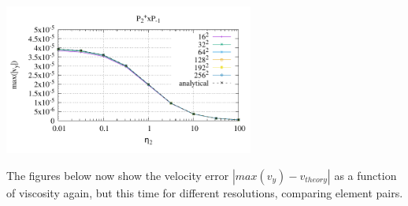 \begin{center}
\includegraphics[width=8.2cm]{python_codes/fieldstone_120/paperresults/rt/structured/rt_wave_vel_P2+P-1.pdf} 
\end{center}

\newpage
The figures below now show the velocity error $|max(v_y)-v_{theory}|$ as a function of viscosity again, 
but this time for different resolutions, comparing element pairs.

